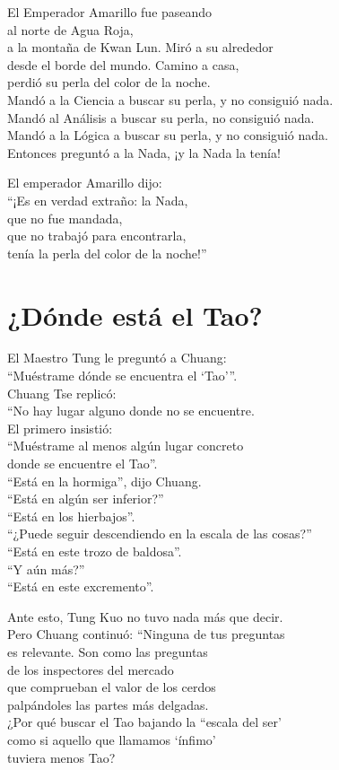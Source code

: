 \documentclass[hidelinks]{memoir}
\begin{document}
	El Emperador Amarillo fue paseando\\
	al norte de Agua Roja,\\
	a la montaña de Kwan Lun. Miró a su alrededor\\
	desde el borde del mundo. Camino a casa,\\
	perdió su perla del color de la noche.\\
	Mandó a la Ciencia a buscar su perla, y no consiguió nada.\\
	Mandó al Análisis a buscar su perla, no consiguió nada.\\
	Mandó a la Lógica a buscar su perla, y no consiguió nada.\\
	Entonces preguntó a la Nada, ¡y la Nada la tenía!
	
	El emperador Amarillo dijo:\\
	``¡Es en verdad extraño: la Nada,\\
	que no fue mandada,\\
	que no trabajó para encontrarla,\\
	tenía la perla del color de la noche!''
	
	\chapter*{¿Dónde está el Tao?}
	
	El Maestro Tung le preguntó a Chuang:\\
	``Muéstrame dónde se encuentra el `Tao'''.\\
	Chuang Tse replicó:\\
	``No hay lugar alguno donde no se encuentre.\\
	El primero insistió:\\
	``Muéstrame al menos algún lugar concreto\\
	donde se encuentre el Tao''.\\
	``Está en la hormiga'', dijo Chuang.\\
	``Está en algún ser inferior?''\\
	``Está en los hierbajos''.\\
	``¿Puede seguir descendiendo en la escala de las cosas?''\\
	``Está en este trozo de baldosa''.\\
	``Y aún más?''\\
	``Está en este excremento''.
	
	Ante esto, Tung Kuo no tuvo nada más que decir.\\
	Pero Chuang continuó: ``Ninguna de tus preguntas\\
	es relevante. Son como las preguntas\\
	de los inspectores del mercado\\
	que comprueban el valor de los cerdos\\
	palpándoles las partes más delgadas.\\
	¿Por qué buscar el Tao bajando la ``escala del ser'\\
	como si aquello que llamamos `ínfimo'\\
	tuviera menos Tao?
	
\end{document}
